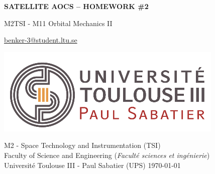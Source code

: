 \begin{titlepage}
    \begin{center}
    
        \vspace*{1cm}
        \Huge
        \textbf{SATELLITE AOCS – HOMEWORK \#2}
            
        \vspace{0.5cm}
        \LARGE
        M2TSI - M11 Orbital Mechanics II


            
        \vspace{2cm}
        \Large
        \begin{flushleft}
              \tab\url{benker-3@student.ltu.se}
            
            
        \end{flushleft}
            
        \vfill
            
        \includegraphics[width=0.6\linewidth]{Graphics/Vignette logo.png}
        \vfill
   
        
        \begin{flushleft}
            \large
            M2 - Space Technology and Instrumentation (TSI) \\
            Faculty of Science and Engineering (\textit{Faculté sciences et ingénierie}) \\
            Université Toulouse III - Paul Sabatier (UPS)
            \today
        \end{flushleft}
                   
            
    \end{center}
\end{titlepage}